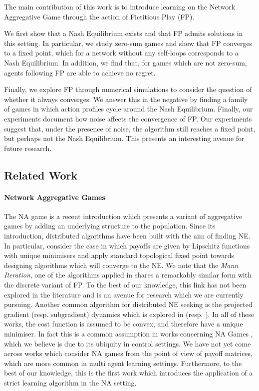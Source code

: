 \documentclass{article}
\theoremstyle{definition}
\begin{document}
  The main contribution of this work is to introduce learning on the Network Aggregative Game
  through the action of Fictitious Play (FP).

  We first show that a Nash Equilibrium exists and that FP admits
  solutions in this setting. In particular, we study zero-sum games and show that
  FP converges to a fixed point, which for a network without any
  self-loops corresponds to a Nash Equilibrium. In addition, we find that, for games
  which are not zero-sum, agents following FP are able to
  achieve no regret.

  Finally, we explore FP through numerical simulations to consider the
  question of whether it always converges. We answer this in the negative by finding a family of
  games in which action profiles cycle around the Nash Equilibrium. Finally, our experiments
  document how noise affects the convergence of FP. Our experiments suggest that, under
  the presence of noise, the algorithm still reaches a fixed point, but perhaps not the Nash
  Equilibrium. This presents an interesting avenue for future research.

\subsection{Related Work}

\paragraph{Network Aggregative Games}

The NA game is a recent introduction \cite{Parise2015} which presents a variant of aggregative games
by adding an underlying structure to the population. Since its introduction, distributed algorithms
have been built with the aim of finding NE. In particular, \cite{Parise2015, Parise2020} consider
the case in which payoffs are given by Lipschitz functions with unique minimisers and apply standard
topological fixed point towards designing algorithms which will converge to the NE. We note that the
\emph{Mann Iteration}, one of the algorithms applied in \cite{Parise2020} shares a remarkably
similar form with the discrete variant of FP. To the best of our knowledge, this link has not been
explored in the literature and is an avenue for research which we are currently pursuing. Another
common algorithm for distributed NE seeking is the projected gradient (resp. subgradient) dynamics
which is explored in \cite{Zhang2020} (resp. \cite{Shokri2020, Shokri2021}). In all of these works,
the cost function is assumed to be convex, and therefore have a unique minimiser. In fact this is a
common assumption in works concerning NA Games \cite{Zhu2021, Lei2020}, which we believe is due to
its ubiquity in control settings. We have not yet come across works which consider NA games from the
point of view of payoff matrices, which are more common in multi agent learning settings.
Furthermore, to the best of our knowledge, this is the first work which introduces the application
of a strict learning algorithm in the NA setting.
\end{document}
